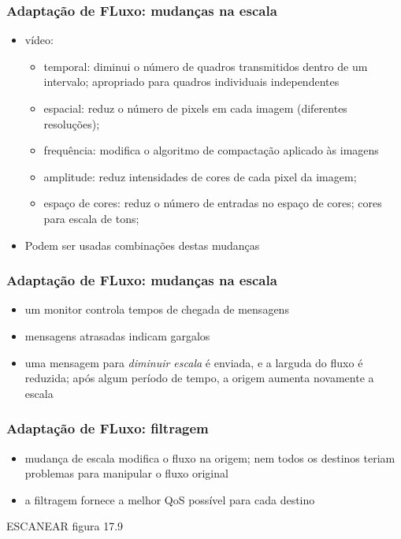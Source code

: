 \documentclass[]{beamer}
\begin{document}
\begin{frame}
 \frametitle{Adaptação de FLuxo: mudanças na escala}
 \begin{itemize}
   \item vídeo: 
     \begin{itemize}
       \item temporal: diminui o número de quadros transmitidos dentro de um intervalo;
apropriado para quadros individuais independentes
        \item espacial: reduz o número de pixels em cada imagem (diferentes resoluções); 
        \item frequência: modifica o algoritmo de compactação aplicado às imagens
        \item amplitude: reduz intensidades de cores de cada pixel da imagem;
        \item espaço de cores: reduz o número de entradas no espaço de cores; cores para
escala de tons;
     \end{itemize}
     \item Podem ser usadas combinações destas mudanças
  \end{itemize}
\end{frame}

\begin{frame}
 \frametitle{Adaptação de FLuxo: mudanças na escala}
 \begin{itemize}
   \item um monitor controla tempos de chegada de mensagens
   \item mensagens atrasadas indicam gargalos
   \item uma mensagem para \emph{diminuir escala} é enviada, e a larguda do fluxo é
reduzida; após algum período de tempo, a origem aumenta novamente a escala
  \end{itemize}
\end{frame}

\begin{frame}
 \frametitle{Adaptação de FLuxo: filtragem}
 \begin{itemize}
   \item mudança de escala modifica o fluxo na origem; nem todos os destinos teriam 
problemas para manipular o fluxo original
   \item a filtragem fornece a melhor QoS possível para cada destino
  \end{itemize}
  ESCANEAR figura 17.9
\end{frame}
\end{document}
